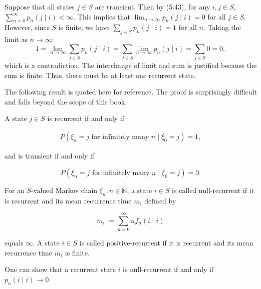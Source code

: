 \begin{Solution}
Suppose that all states $j \in S$ are transient. Then by (5.43), for any $i, j \in S$, $\sum_{n=0}^\infty p_n(j \mid i) < \infty$.
This implies that $\lim_{n \to \infty} p_n(j \mid i) = 0$ for all $j \in S$.
However, since $S$ is finite, we have $\sum_{j \in S} p_n(j \mid i) = 1$ for all $n$.
Taking the limit as $n \to \infty$:
\[
1 = \lim_{n \to \infty} \sum_{j \in S} p_n(j \mid i) = \sum_{j \in S} \lim_{n \to \infty} p_n(j \mid i) = \sum_{j \in S} 0 = 0,
\]
which is a contradiction. The interchange of limit and sum is justified because the sum is finite. Thus, there must be at least one recurrent state.
\end{Solution}

The following result is quoted here for reference. The proof is surprisingly difficult and falls beyond the scope of this book.

\begin{Theorem}
\label{thrm:infinitely-often}
A state $j\in S$ is recurrent if and only if

\begin{align}
P(\xi_n = j \text{ for infinitely many } n \mid \xi_0 = j) = 1,
\end{align}

and is transient if and only if

\begin{equation}
P(\xi_n = j \text{ for infinitely many } n \mid \xi_0 = j) = 0.
\end{equation}
\end{Theorem}

\begin{Definition}
\label{def:null-positive-recurrent}
For an $S$-valued Markov chain $\xi_n, n\in\mathbb{N}$, a state $i\in S$ is called null-recurrent if it is recurrent and its mean recurrence time $m_i$ defined by

\begin{equation}
m_i := \sum_{n=0}^\infty n f_n(i \mid i) \tag{5.44}
\end{equation}

equals $\infty$. A state $i\in S$ is called positive-recurrent if it is recurrent and its mean recurrence time $m_i$ is finite.
\end{Definition}

\begin{Remark}
\label{rem:null-recurrent-criterion}
One can show that a recurrent state $i$ is null-recurrent if and only if $p_n(i \mid i) \to 0$.
\end{Remark}

